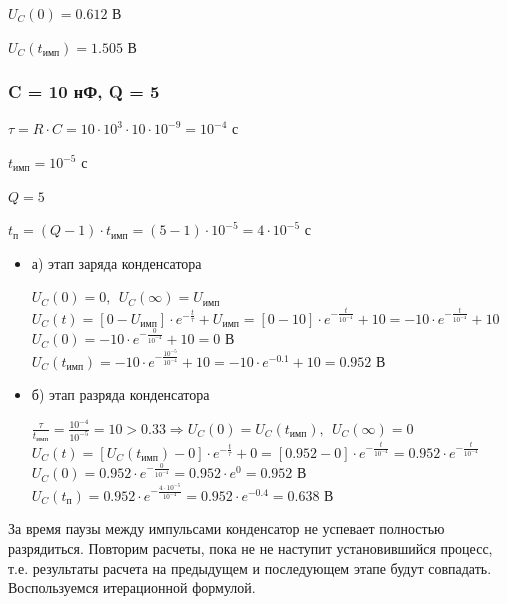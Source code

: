 \documentclass[a4paper,14pt]{extarticle}
\begin{document}
$U_C(0) = 0.612 \text{ В}$
	
$U_C(t_\text{имп}) = 1.505 \text{ В}$
	
\subsubsection{C = 10 нФ, Q = 5}

$\tau = R \cdot C = 10 \cdot 10^3 \cdot 10 \cdot 10^{-9} = 10^{-4} \text{ с}$

$t_\text{имп} = 10^{-5} \text{ с}$

$Q = 5$		

$t_\text{п} = (Q - 1) \cdot t_\text{имп} = (5 - 1) \cdot 10^{-5} = 4 \cdot 10^{-5} \text{ с}$
			
\begin{itemize}
	\item[] а) этап заряда конденсатора

	$U_C(0) = 0,\ \ U_C(\infty) = U_\text{имп}$\\	
	$U_C(t) = [0 - U_\text{имп}] \cdot e^{-\frac{t}{\tau}} + U_\text{имп} = [0 - 10] \cdot e^{-\frac{t}{10^{-4}}} + 10 = -10 \cdot e^{-\frac{t}{10^{-4}}} + 10$\\
	$U_C(0) = -10 \cdot e^{-\frac{0}{10^{-4}}} + 10 = 0 \text{ В}$\\
	$U_C(t_\text{имп}) = -10 \cdot e^{-\frac{10^{-5}}{10^{-4}}} + 10 = -10 \cdot e^{-0.1} + 10 = 0.952 \text{ В}$
	
	\item[] б) этап разряда конденсатора

	$\frac{\tau}{t_\text{имп}} = \frac{10^{-4}}{10^{-5}} = 10 > 0.33 \Rightarrow U_C(0) = U_C(t_\text{имп}),\ \ U_C(\infty) = 0$\\
	$U_C(t) = [U_C(t_\text{имп}) - 0] \cdot e^{-\frac{t}{\tau}} + 0 =  [0.952 - 0] \cdot e^{-\frac{t}{10^{-4}}} = 0.952 \cdot e^{-\frac{t}{10^{-4}}}$\\
	$U_C(0) = 0.952 \cdot e^{-\frac{0}{10^{-4}}} = 0.952 \cdot e^0 = 0.952 \text{ В}$\\
	$U_C(t_\text{п}) = 0.952 \cdot e^{-\frac{4 \cdot 10^{-5}}{10^{-4}}} = 0.952 \cdot e^{-0.4} = 0.638 \text{ В}$
\end{itemize}				
		
За время паузы между импульсами конденсатор не успевает полностью разрядиться. Повторим расчеты, пока не не наступит установившийся процесс, т.е. результаты расчета на предыдущем и последующем этапе будут совпадать.	Воспользуемся итерационной формулой.
\end{document}
